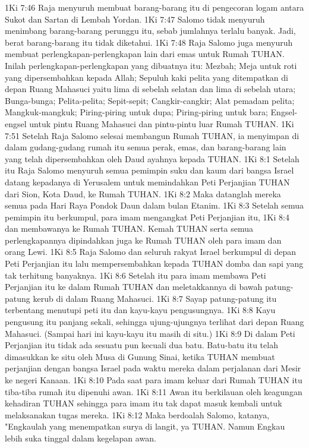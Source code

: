 1Ki 7:46  Raja menyuruh membuat barang-barang itu di pengecoran logam antara Sukot dan Sartan di Lembah Yordan.
1Ki 7:47  Salomo tidak menyuruh menimbang barang-barang perunggu itu, sebab jumlahnya terlalu banyak. Jadi, berat barang-barang itu tidak diketahui.
1Ki 7:48  Raja Salomo juga menyuruh membuat perlengkapan-perlengkapan lain dari emas untuk Rumah TUHAN. Inilah perlengkapan-perlengkapan yang dibuatnya itu: Mezbah; Meja untuk roti yang dipersembahkan kepada Allah; Sepuluh kaki pelita yang ditempatkan di depan Ruang Mahasuci yaitu lima di sebelah selatan dan lima di sebelah utara; Bunga-bunga; Pelita-pelita; Sepit-sepit; Cangkir-cangkir; Alat pemadam pelita; Mangkuk-mangkuk; Piring-piring untuk dupa; Piring-piring untuk bara; Engsel-engsel untuk pintu Ruang Mahasuci dan pintu-pintu luar Rumah TUHAN.
1Ki 7:51  Setelah Raja Salomo selesai membangun Rumah TUHAN, ia menyimpan di dalam gudang-gudang rumah itu semua perak, emas, dan barang-barang lain yang telah dipersembahkan oleh Daud ayahnya kepada TUHAN.
1Ki 8:1  Setelah itu Raja Salomo menyuruh semua pemimpin suku dan kaum dari bangsa Israel datang kepadanya di Yerusalem untuk memindahkan Peti Perjanjian TUHAN dari Sion, Kota Daud, ke Rumah TUHAN.
1Ki 8:2  Maka datanglah mereka semua pada Hari Raya Pondok Daun dalam bulan Etanim.
1Ki 8:3  Setelah semua pemimpin itu berkumpul, para imam mengangkat Peti Perjanjian itu,
1Ki 8:4  dan membawanya ke Rumah TUHAN. Kemah TUHAN serta semua perlengkapannya dipindahkan juga ke Rumah TUHAN oleh para imam dan orang Lewi.
1Ki 8:5  Raja Salomo dan seluruh rakyat Israel berkumpul di depan Peti Perjanjian itu lalu mempersembahkan kepada TUHAN domba dan sapi yang tak terhitung banyaknya.
1Ki 8:6  Setelah itu para imam membawa Peti Perjanjian itu ke dalam Rumah TUHAN dan meletakkannya di bawah patung-patung kerub di dalam Ruang Mahasuci.
1Ki 8:7  Sayap patung-patung itu terbentang menutupi peti itu dan kayu-kayu pengusungnya.
1Ki 8:8  Kayu pengusung itu panjang sekali, sehingga ujung-ujungnya terlihat dari depan Ruang Mahasuci. (Sampai hari ini kayu-kayu itu masih di situ.)
1Ki 8:9  Di dalam Peti Perjanjian itu tidak ada sesuatu pun kecuali dua batu. Batu-batu itu telah dimasukkan ke situ oleh Musa di Gunung Sinai, ketika TUHAN membuat perjanjian dengan bangsa Israel pada waktu mereka dalam perjalanan dari Mesir ke negeri Kanaan.
1Ki 8:10  Pada saat para imam keluar dari Rumah TUHAN itu tiba-tiba rumah itu dipenuhi awan.
1Ki 8:11  Awan itu berkilauan oleh keagungan kehadiran TUHAN sehingga para imam itu tak dapat masuk kembali untuk melaksanakan tugas mereka.
1Ki 8:12  Maka berdoalah Salomo, katanya, "Engkaulah yang menempatkan surya di langit, ya TUHAN. Namun Engkau lebih suka tinggal dalam kegelapan awan.
